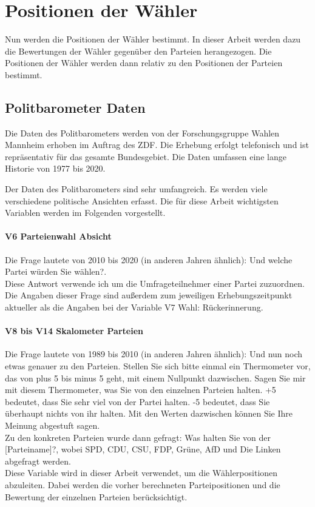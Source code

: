 \section{Positionen der Wähler}\label{Sec-Wählerpositionen}

Nun werden die Positionen der Wähler bestimmt. In dieser Arbeit werden dazu die Bewertungen der Wähler gegenüber den Parteien herangezogen. Die Positionen der Wähler werden dann relativ zu den Positionen der Parteien bestimmt.

\subsection{Politbarometer Daten}
Die Daten des Politbarometers \citep{politbarometer} werden von der Forschungsgruppe Wahlen Mannheim erhoben im Auftrag des ZDF. Die Erhebung erfolgt telefonisch und ist repräsentativ für das gesamte Bundesgebiet. Die Daten umfassen eine lange Historie von 1977 bis 2020.

Der Daten des Politbarometers sind sehr umfangreich. Es werden viele verschiedene politische Ansichten erfasst. Die für diese Arbeit wichtigsten Variablen werden im Folgenden vorgestellt.

\paragraph{V6 Parteienwahl Absicht}
Die Frage lautete von 2010 bis 2020 (in anderen Jahren ähnlich): \glqq Und welche Partei würden Sie wählen?\grqq. \citep[Variablendokumentation, S.\,12]{politbarometer}\\
Diese Antwort verwende ich um die Umfrageteilnehmer einer Partei zuzuordnen. Die Angaben dieser Frage sind außerdem zum jeweiligen Erhebungszeitpunkt aktueller als die Angaben bei der Variable \glqq V7 Wahl: Rückerinnerung\grqq.

\paragraph{V8 bis V14 Skalometer Parteien}
Die Frage lautete von 1989 bis 2010 (in anderen Jahren ähnlich): \glqq Und nun noch etwas genauer zu den Parteien. Stellen Sie sich bitte einmal ein Thermometer vor, das von plus 5 bis minus 5 geht, mit einem Nullpunkt dazwischen. Sagen Sie mir mit diesem Thermometer, was Sie von den einzelnen Parteien halten. +5 bedeutet, dass Sie sehr viel von der Partei halten. -5 bedeutet, dass Sie überhaupt nichts von ihr halten. Mit den Werten dazwischen können Sie Ihre Meinung abgestuft sagen.\grqq\\
Zu den konkreten Parteien wurde dann gefragt: \glqq Was halten Sie von der [Parteiname]?\grqq, wobei SPD, CDU, CSU, FDP, Grüne, AfD und Die Linken abgefragt werden. \citep[Variablendokumentation, S.\,28-29]{politbarometer}\\
Diese Variable wird in dieser Arbeit verwendet, um die Wählerpositionen abzuleiten. Dabei werden die vorher berechneten Parteipositionen und die Bewertung der einzelnen Parteien berücksichtigt.

